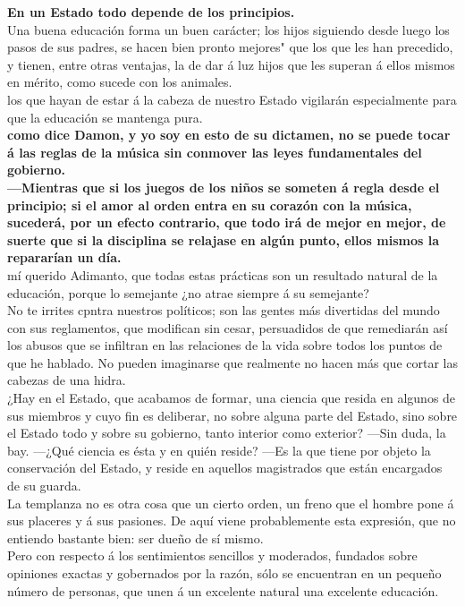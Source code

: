 \documentclass[10pt]{book}
\begin{document}
\textbf{En un Estado todo depende de los principios.}\\
Una buena educación forma un buen carácter; los hijos siguiendo desde luego los pasos de sus padres, se hacen bien pronto mejores" que los que les han precedido, y tienen, entre otras ventajas, la de dar á luz hijos que les superan á ellos mismos en mérito, como sucede con los animales. \\
los que hayan de estar á la cabeza de nuestro Estado vigilarán especialmente para que la educación se mantenga pura.\\
\textbf{como dice Damon, y yo soy en esto de su dictamen, no se puede tocar á las reglas de la música sin conmover las leyes fundamentales del gobierno. }\\
\textbf{—Mientras que si los juegos de los niños se someten á regla desde el principio; si el amor al orden entra en su corazón con la música, sucederá, por un efecto contrario, que todo irá de mejor en mejor, de suerte que si la disciplina se relajase en algún punto, ellos mismos la repararían un día. }\\ mí querido Adimanto, que todas estas prácticas son un resultado natural de la educación, porque lo semejante ¿no atrae siempre á su semejante?\\
No te irrites cpntra nuestros políticos; son las gentes más divertidas del mundo con sus reglamentos, que modifican sin cesar, persuadidos de que remediarán así los abusos que se infiltran en las relaciones de la vida sobre todos los puntos de que he hablado. No pueden imaginarse que realmente no hacen más que cortar las cabezas de una hidra.\\
¿Hay en el Estado, que acabamos de formar, una ciencia que resida en algunos de sus miembros y cuyo fin es deliberar, no sobre alguna parte del Estado, sino sobre el Estado todo y sobre su gobierno, tanto interior como exterior? —Sin duda, la bay. —¿Qué ciencia es ésta y en quién reside? —Es la que tiene por objeto la conservación del Estado, y reside en aquellos magistrados que están encargados de su guarda. \\
 La templanza no es otra cosa que un cierto orden, un freno que el hombre pone á sus placeres y á sus pasiones. De aquí viene probablemente esta expresión, que no entiendo bastante bien: ser dueño de sí mismo.\\
Pero con respecto á los sentimientos sencillos y moderados, fundados sobre opiniones exactas y gobernados por la razón, sólo se encuentran en un pequeño número de personas, que unen á un excelente natural una excelente educación. \\
\end{document}

